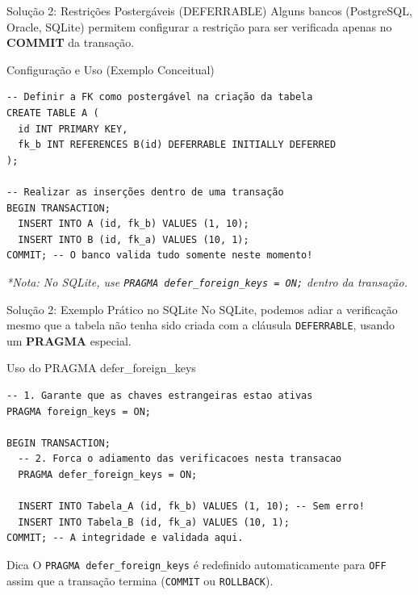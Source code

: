 \documentclass[9pt]{beamer}
\begin{document}
\begin{frame}[fragile]{Solução 2: Restrições Postergáveis (DEFERRABLE)}
  \small
  Alguns bancos (PostgreSQL, Oracle, SQLite) permitem configurar a restrição para ser verificada apenas no \textbf{COMMIT} da transação.
  \vspace{0.2cm}
  \begin{exampleblock}{Configuração e Uso (Exemplo Conceitual)}
\begin{lstlisting}
-- Definir a FK como postergável na criação da tabela
CREATE TABLE A (
  id INT PRIMARY KEY,
  fk_b INT REFERENCES B(id) DEFERRABLE INITIALLY DEFERRED
);

-- Realizar as inserções dentro de uma transação
BEGIN TRANSACTION;
  INSERT INTO A (id, fk_b) VALUES (1, 10);
  INSERT INTO B (id, fk_a) VALUES (10, 1);
COMMIT; -- O banco valida tudo somente neste momento!
\end{lstlisting}
  \end{exampleblock}
  \textit{*Nota: No SQLite, use \texttt{PRAGMA defer\_foreign\_keys = ON;} dentro da transação.}
\end{frame}

\begin{frame}[fragile]{Solução 2: Exemplo Prático no SQLite}
  \small
  No SQLite, podemos adiar a verificação mesmo que a tabela não tenha sido criada com a cláusula \texttt{DEFERRABLE}, usando um \textbf{PRAGMA} especial.
  \vspace{0.2cm}
  \begin{exampleblock}{Uso do PRAGMA defer\_foreign\_keys}
\begin{lstlisting}
-- 1. Garante que as chaves estrangeiras estao ativas
PRAGMA foreign_keys = ON;

BEGIN TRANSACTION;
  -- 2. Forca o adiamento das verificacoes nesta transacao
  PRAGMA defer_foreign_keys = ON; 

  INSERT INTO Tabela_A (id, fk_b) VALUES (1, 10); -- Sem erro!
  INSERT INTO Tabela_B (id, fk_a) VALUES (10, 1);
COMMIT; -- A integridade e validada aqui.
\end{lstlisting}
  \end{exampleblock}
  \begin{alertblock}{Dica}
    O \texttt{PRAGMA defer\_foreign\_keys} é redefinido automaticamente para \texttt{OFF} assim que a transação termina (\texttt{COMMIT} ou \texttt{ROLLBACK}).
  \end{alertblock}
\end{frame}
\end{document}
